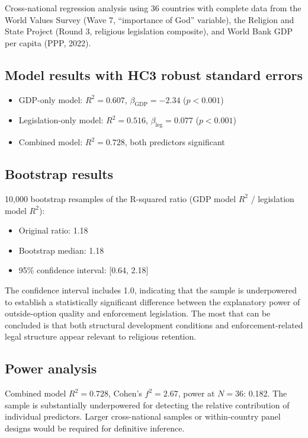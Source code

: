 \documentclass[12pt]{article}
\begin{document}
Cross-national regression analysis using 36 countries with complete data from the World Values Survey (Wave 7, ``importance of God'' variable), the Religion and State Project (Round 3, religious legislation composite), and World Bank GDP per capita (PPP, 2022).

\subsection{Model results with HC3 robust standard errors}

\begin{itemize}
\item GDP-only model: $R^2 = 0.607$, $\beta_{\text{GDP}} = -2.34$ ($p < 0.001$)
\item Legislation-only model: $R^2 = 0.516$, $\beta_{\text{leg}} = 0.077$ ($p < 0.001$)
\item Combined model: $R^2 = 0.728$, both predictors significant
\end{itemize}

\subsection{Bootstrap results}

10,000 bootstrap resamples of the R-squared ratio (GDP model $R^2$ / legislation model $R^2$):

\begin{itemize}
\item Original ratio: 1.18
\item Bootstrap median: 1.18
\item 95\% confidence interval: [0.64, 2.18]
\end{itemize}

The confidence interval includes 1.0, indicating that the sample is underpowered to establish a statistically significant difference between the explanatory power of outside-option quality and enforcement legislation. The most that can be concluded is that both structural development conditions and enforcement-related legal structure appear relevant to religious retention.

\subsection{Power analysis}

Combined model $R^2 = 0.728$, Cohen's $f^2 = 2.67$, power at $N = 36$: 0.182. The sample is substantially underpowered for detecting the relative contribution of individual predictors. Larger cross-national samples or within-country panel designs would be required for definitive inference.
\end{document}
